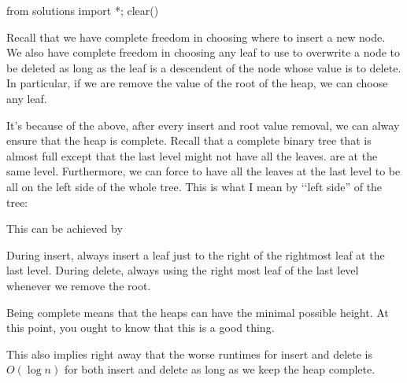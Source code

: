 \begin{python0}
from solutions import *; clear()
\end{python0}

Recall that we have complete freedom in choosing where to insert a new node.
We also have complete freedom in choosing any leaf to use to overwrite
a node to be deleted as long as the leaf is a descendent of the node whose
value is to delete.
In particular, if we are remove the value of the root of the heap,
we can choose any leaf.

It's because of the above,
after every insert and root value removal,
we can alway ensure that the heap is complete.
Recall that a complete binary tree that is almost full except that the
last level might not have all the leaves.
are at the same level.
Furthermore, we can force to have
all the leaves at the last level to be all on the left side of the whole
tree.
This is what I mean by \lq\lq left side'' of the tree:



This can be achieved by
\begin{tightlist}
\li During insert, always insert a leaf just to the right of the
rightmost leaf at the last level.
\li During delete, always using the right most leaf of the 
last level whenever we remove the root.
\end{tightlist}










Being complete means that the heaps can have the minimal possible height.
At this point, you ought to know that this is a good thing.

This also implies right away that the worse runtimes for 
insert and delete is $O(\log n)$ for both insert and delete
as long as we keep the heap complete.

